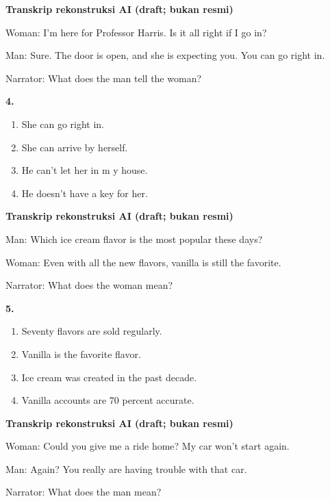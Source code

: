 \documentclass[12pt]{article}
\begin{document}
\par
\vspace{0.25\baselineskip}
\begin{exampleblock}
\textbf{Transkrip rekonstruksi AI (draft; bukan resmi)}\par
Woman: I'm here for Professor Harris. Is it all right if I go in?\par
Man: Sure. The door is open, and she is expecting you. You can go right in.\par
Narrator: What does the man tell the woman?\par
\end{exampleblock}
\noindent\textbf{4.}
\begin{enumerate}[label=(\Alph*),leftmargin=*,itemsep=0.2em]
\item She can go right in.
\item She can arrive by herself.
\item He can't let her in m y house.
\item He doesn't have a key for her.
\end{enumerate}
\par
\vspace{0.25\baselineskip}
\begin{exampleblock}
\textbf{Transkrip rekonstruksi AI (draft; bukan resmi)}\par
Man: Which ice cream flavor is the most popular these days?\par
Woman: Even with all the new flavors, vanilla is still the favorite.\par
Narrator: What does the woman mean?\par
\end{exampleblock}
\noindent\textbf{5.}
\begin{enumerate}[label=(\Alph*),leftmargin=*,itemsep=0.2em]
\item Seventy flavors are sold regularly.
\item Vanilla is the favorite flavor.
\item Ice cream was created in the past decade.
\item Vanilla accounts are 70 percent accurate.
\end{enumerate}
\par
\vspace{0.25\baselineskip}
\begin{exampleblock}
\textbf{Transkrip rekonstruksi AI (draft; bukan resmi)}\par
Woman: Could you give me a ride home? My car won't start again.\par
Man: Again? You really are having trouble with that car.\par
Narrator: What does the man mean?\par
\end{exampleblock}
\end{document}
